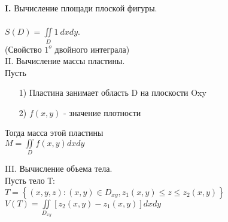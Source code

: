 
\textbf{I.} Вычисление площади плоской фигуры. \\
\\
$\displaystyle  S(D) = \iint\limits_{D} 1 \ dxdy$. \\
(Свойство $1^o$ двойного интеграла) \\



II. Вычисление массы пластины. \\
Пусть 
\begin{enumerate}
	\item[1)] 
	Пластина занимает область D на плоскости Oxy
	
	\item[2)]
	$f(x,y)$ - значение плотности
\end{enumerate} 
Тогда масса этой пластины \\
$\displaystyle  M = \iint\limits_{D} f(x,y) dxdy$



III. Вычисление объема тела. \\

Пусть тело Т: \\
$T = \left\{ \left(x,y,z\right) : (x,y) \in D_{xy}, z_1(x,y) \leqslant z \leqslant z_2(x,y) \right\}$ \\
$V(T) = \iint\limits_{D_{xy}} \left[ z_2(x,y) - z_1(x,y) \right] dxdy$
